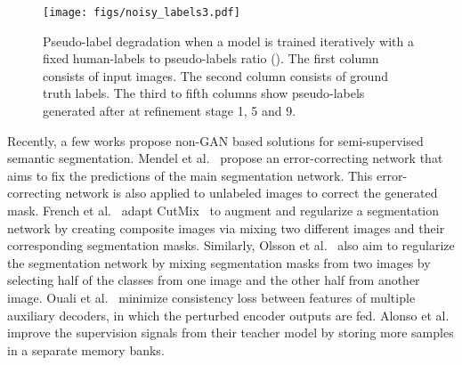 \documentclass[10pt, conference, compsocconf]{IEEEtran}
\begin{document}
\begin{figure}[htb]
  \centering
  \texttt{[image: figs/noisy\_labels3.pdf]}
  \caption{Pseudo-label degradation when a model is trained iteratively with a fixed human-labels to pseudo-labels ratio (). The first column consists of input images. The second column consists of ground truth labels. The third to fifth columns show pseudo-labels generated after at refinement stage 1, 5 and 9.
  }
  \label{fig:noisy}
\end{figure}

Recently, a few works propose non-GAN based solutions for semi-supervised semantic segmentation. 
Mendel et al.~\cite{mendelsemi} propose an error-correcting network that aims to fix the predictions of the main segmentation network. This error-correcting network is also applied to unlabeled images to correct the generated mask.
French et al.~\cite{french2019semi} adapt CutMix~\cite{yun2019cutmix} to augment and regularize a segmentation network by creating composite images via mixing two different images and their corresponding segmentation masks.
Similarly, Olsson et al.~\cite{olsson2020classmix} also aim to regularize the segmentation network by mixing segmentation masks from two images by selecting half of the classes from one image and the other half from another image.
Ouali et al.~\cite{Ouali_2020_CVPR} minimize consistency loss between features of multiple auxiliary decoders, in which the perturbed encoder outputs are fed.
Alonso et al.~\cite{alonso2021semi} improve the supervision signals from their teacher model by storing more samples in a separate memory banks. 
\end{document}
